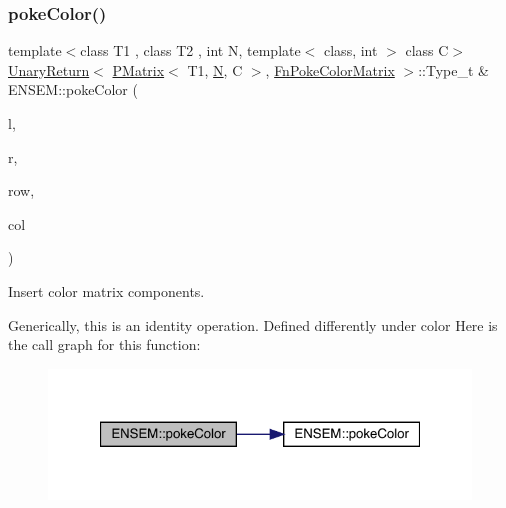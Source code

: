 \subsubsection{\texorpdfstring{pokeColor()}{pokeColor()}\hspace{0.1cm}{\footnotesize\ttfamily [2/2]}}
{\footnotesize\ttfamily template$<$class T1 , class T2 , int N, template$<$ class, int $>$ class C$>$ \\
\mbox{\hyperlink{structENSEM_1_1UnaryReturn}{Unary\+Return}}$<$ \mbox{\hyperlink{classENSEM_1_1PMatrix}{P\+Matrix}}$<$ T1, \mbox{\hyperlink{operator__name__util_8cc_a7722c8ecbb62d99aee7ce68b1752f337}{N}}, C $>$, \mbox{\hyperlink{structENSEM_1_1FnPokeColorMatrix}{Fn\+Poke\+Color\+Matrix}} $>$\+::Type\+\_\+t \& E\+N\+S\+E\+M\+::poke\+Color (\begin{DoxyParamCaption}\item[{\mbox{\hyperlink{classENSEM_1_1PMatrix}{P\+Matrix}}$<$ T1, \mbox{\hyperlink{operator__name__util_8cc_a7722c8ecbb62d99aee7ce68b1752f337}{N}}, C $>$ \&}]{l,  }\item[{const \mbox{\hyperlink{classENSEM_1_1PMatrix}{P\+Matrix}}$<$ T2, \mbox{\hyperlink{operator__name__util_8cc_a7722c8ecbb62d99aee7ce68b1752f337}{N}}, C $>$ \&}]{r,  }\item[{int}]{row,  }\item[{int}]{col }\end{DoxyParamCaption})\hspace{0.3cm}{\ttfamily [inline]}}



Insert color matrix components. 

Generically, this is an identity operation. Defined differently under color Here is the call graph for this function\+:\nopagebreak
\begin{figure}[H]
\begin{center}
\leavevmode
\includegraphics[width=321pt]{df/d0a/group__primmatrix_gab840db69dc60bcb095f46b69353d09f3_cgraph}
\end{center}
\end{figure}
\mbox{\label{group__primmatrix_ga738f0f1d3bad8770111452c72714a4ae}} 
